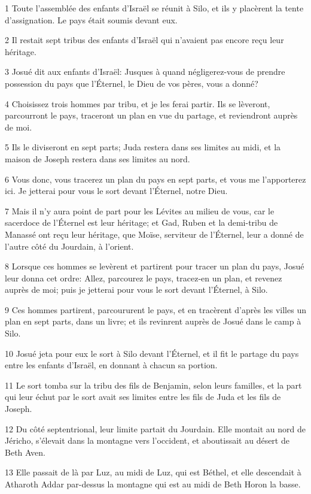 \par 1 Toute l'assemblée des enfants d'Israël se réunit à Silo, et ils y placèrent la tente d'assignation. Le pays était soumis devant eux.
\par 2 Il restait sept tribus des enfants d'Israël qui n'avaient pas encore reçu leur héritage.
\par 3 Josué dit aux enfants d'Israël: Jusques à quand négligerez-vous de prendre possession du pays que l'Éternel, le Dieu de vos pères, vous a donné?
\par 4 Choisissez trois hommes par tribu, et je les ferai partir. Ils se lèveront, parcourront le pays, traceront un plan en vue du partage, et reviendront auprès de moi.
\par 5 Ils le diviseront en sept parts; Juda restera dans ses limites au midi, et la maison de Joseph restera dans ses limites au nord.
\par 6 Vous donc, vous tracerez un plan du pays en sept parts, et vous me l'apporterez ici. Je jetterai pour vous le sort devant l'Éternel, notre Dieu.
\par 7 Mais il n'y aura point de part pour les Lévites au milieu de vous, car le sacerdoce de l'Éternel est leur héritage; et Gad, Ruben et la demi-tribu de Manassé ont reçu leur héritage, que Moïse, serviteur de l'Éternel, leur a donné de l'autre côté du Jourdain, à l'orient.
\par 8 Lorsque ces hommes se levèrent et partirent pour tracer un plan du pays, Josué leur donna cet ordre: Allez, parcourez le pays, tracez-en un plan, et revenez auprès de moi; puis je jetterai pour vous le sort devant l'Éternel, à Silo.
\par 9 Ces hommes partirent, parcoururent le pays, et en tracèrent d'après les villes un plan en sept parts, dans un livre; et ils revinrent auprès de Josué dans le camp à Silo.
\par 10 Josué jeta pour eux le sort à Silo devant l'Éternel, et il fit le partage du pays entre les enfants d'Israël, en donnant à chacun sa portion.
\par 11 Le sort tomba sur la tribu des fils de Benjamin, selon leurs familles, et la part qui leur échut par le sort avait ses limites entre les fils de Juda et les fils de Joseph.
\par 12 Du côté septentrional, leur limite partait du Jourdain. Elle montait au nord de Jéricho, s'élevait dans la montagne vers l'occident, et aboutissait au désert de Beth Aven.
\par 13 Elle passait de là par Luz, au midi de Luz, qui est Béthel, et elle descendait à Atharoth Addar par-dessus la montagne qui est au midi de Beth Horon la basse.

